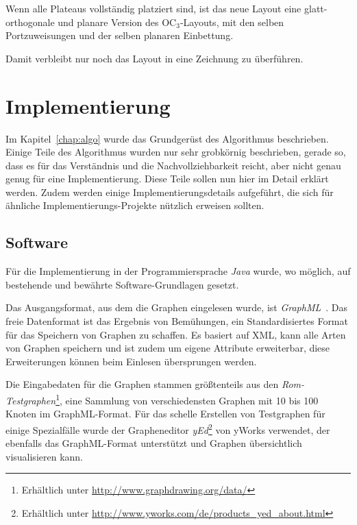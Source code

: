 \documentclass[a4paper]{scrreprt}
\theoremstyle{definition}
\begin{document}

Wenn alle Plateaus vollständig platziert sind, ist das neue Layout eine glatt-orthogonale und planare Version des OC$_3$-Layouts, mit den selben Portzuweisungen und der selben planaren Einbettung.

Damit verbleibt nur noch das Layout in eine Zeichnung zu überführen. 



\chapter{Implementierung}

Im Kapitel~\ref{chap:algo} wurde das Grundgerüst des Algorithmus beschrieben. Einige Teile des Algorithmus wurden nur sehr grobkörnig beschrieben, gerade so, dass es für das Verständnis und die Nachvollziehbarkeit reicht, aber nicht genau genug für eine Implementierung. Diese Teile sollen nun hier im Detail erklärt werden. Zudem werden einige Implementierungsdetails aufgeführt, die sich für ähnliche Implementierungs-Projekte nützlich erweisen sollten.

\section{Software}

Für die Implementierung in der Programmiersprache \emph{Java} wurde, wo möglich, auf bestehende und bewährte Software-Grundlagen gesetzt.

Das Ausgangsformat, aus dem die Graphen eingelesen wurde, ist \emph{GraphML}~\cite{brandes+al-14}. Das freie Datenformat ist das Ergebnis von Bemühungen, ein Standardisiertes Format für das Speichern von Graphen zu schaffen. Es basiert auf XML, kann alle Arten von Graphen speichern und ist zudem um eigene Attribute erweiterbar, diese Erweiterungen können beim Einlesen übersprungen werden.

Die Eingabedaten für die Graphen stammen größtenteils aus den \emph{Rom-Testgraphen}\footnote{Erhältlich unter \url{http://www.graphdrawing.org/data/}}, eine Sammlung von verschiedensten Graphen mit 10 bis 100 Knoten im GraphML-Format. Für das schelle Erstellen von Testgraphen für einige Spezialfälle wurde der Grapheneditor \emph{yEd}\footnote{Erhältlich unter \url{http://www.yworks.com/de/products_yed_about.html}} von yWorks verwendet, der ebenfalls das GraphML-Format unterstützt und Graphen übersichtlich visualisieren kann.
\end{document}
